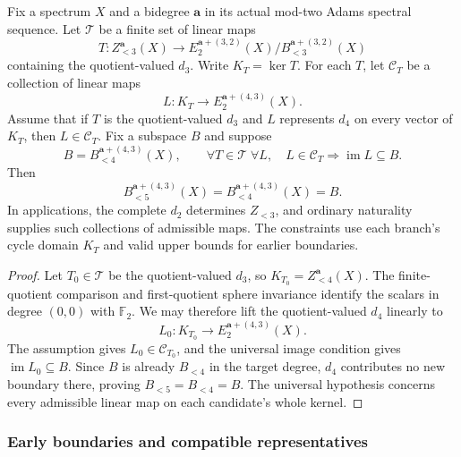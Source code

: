 \begin{corollary}
\label{sem:ProofTools:coverage-finite-boundary-branches}
Fix a spectrum $X$ and a bidegree $\mathbf a$ in its actual mod-two
Adams spectral sequence. Let $\mathcal T$ be a finite set of linear maps
\[
T:Z_{<3}^{\mathbf a}(X)\longrightarrow
E_2^{\mathbf a+(3,2)}(X)/B_{<3}^{\mathbf a+(3,2)}(X)
\]
containing the quotient-valued $d_3$. Write $K_T=\ker T$.
For each $T$, let $\mathcal C_T$ be a collection of linear maps
\[
L:K_T\longrightarrow E_2^{\mathbf a+(4,3)}(X).
\]
Assume that if $T$ is the quotient-valued $d_3$ and $L$ represents
$d_4$ on every vector of $K_T$, then $L\in\mathcal C_T$.
Fix a subspace $B$ and suppose
\[
B=B_{<4}^{\mathbf a+(4,3)}(X),\qquad
\forall T\in\mathcal T\;\forall L,
\quad L\in\mathcal C_T\Longrightarrow\operatorname{im}L\subseteq B.
\]
Then
\[
B_{<5}^{\mathbf a+(4,3)}(X)
 =B_{<4}^{\mathbf a+(4,3)}(X)=B.
\]
In applications, the complete $d_2$ determines $Z_{<3}$, and ordinary
naturality supplies such collections of admissible maps. The constraints
use each branch's cycle domain $K_T$ and valid upper bounds for earlier boundaries.
\end{corollary}
\begin{proof}
Let $T_0\in\mathcal T$ be the quotient-valued $d_3$, so
$K_{T_0}=Z_{<4}^{\mathbf a}(X)$.
The finite-quotient comparison and first-quotient sphere invariance
identify the scalars in degree $(0,0)$ with $\mathbb F_2$.
We may therefore lift the quotient-valued $d_4$ linearly to
\[
L_0:K_{T_0}\longrightarrow E_2^{\mathbf a+(4,3)}(X).
\]
The assumption gives $L_0\in\mathcal C_{T_0}$, and the universal image
condition gives $\operatorname{im}L_0\subseteq B$.
Since $B$ is already $B_{<4}$ in the target degree, $d_4$ contributes
no new boundary there, proving $B_{<5}=B_{<4}=B$.
The universal hypothesis concerns every admissible linear map on
each candidate's whole kernel.
\end{proof}


\subsubsection{Early boundaries and compatible representatives}

